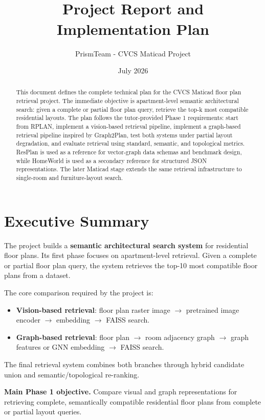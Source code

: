 \documentclass[11pt,a4paper]{article}
\title{\textbf{\projecttitle}\\\large Project Report and Implementation Plan}
\author{PrismTeam - CVCS Maticad Project}
\date{July 2026}
\begin{document}
\maketitle
\begin{abstract}
This document defines the complete technical plan for the CVCS Maticad floor plan retrieval project. The immediate objective is apartment-level semantic architectural search: given a complete or partial floor plan query, retrieve the top-k most compatible residential layouts. The plan follows the tutor-provided Phase 1 requirements: start from RPLAN, implement a vision-based retrieval pipeline, implement a graph-based retrieval pipeline inspired by Graph2Plan, test both systems under partial layout degradation, and evaluate retrieval using standard, semantic, and topological metrics. ResPlan is used as a reference for vector-graph data schemas and benchmark design, while HomeWorld is used as a secondary reference for structured JSON representations. The later Maticad stage extends the same retrieval infrastructure to single-room and furniture-layout search.
\end{abstract}
\tableofcontents
\newpage

\section{Executive Summary}

The project builds a \textbf{semantic architectural search system} for residential floor plans. Its first phase focuses on apartment-level retrieval. Given a complete or partial floor plan query, the system retrieves the top-10 most compatible floor plans from a dataset.

The core comparison required by the project is:
\begin{itemize}
    \item \textbf{Vision-based retrieval}: floor plan raster image $\rightarrow$ pretrained image encoder $\rightarrow$ embedding $\rightarrow$ FAISS search.
    \item \textbf{Graph-based retrieval}: floor plan $\rightarrow$ room adjacency graph $\rightarrow$ graph features or GNN embedding $\rightarrow$ FAISS search.
\end{itemize}

The final retrieval system combines both branches through hybrid candidate union and semantic/topological re-ranking.

\begin{tcolorbox}
\textbf{Main Phase 1 objective.} Compare visual and graph representations for retrieving complete, semantically compatible residential floor plans from complete or partial layout queries.
\end{tcolorbox}
\end{document}
